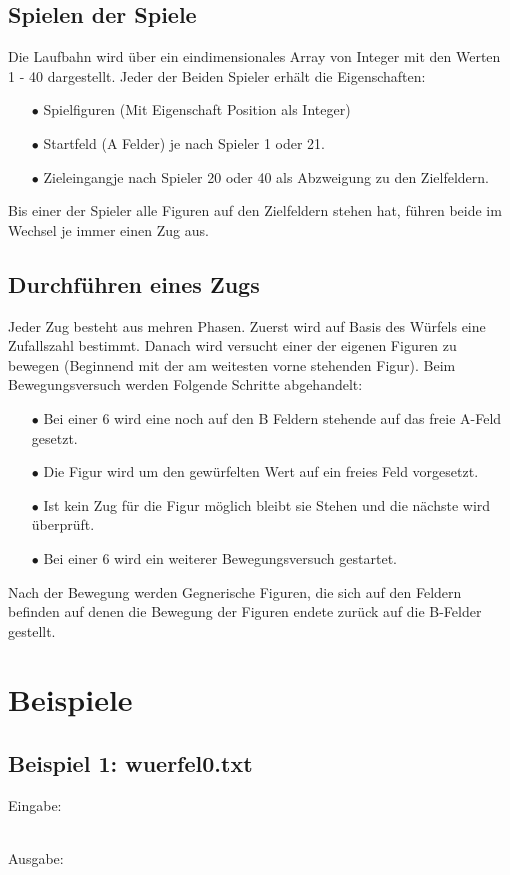 \documentclass[a4paper,11pt,ngerman]{scrartcl}
\begin{document}
\subsection{Spielen der \glqq Spiele\grqq}
Die Laufbahn wird über ein eindimensionales Array von Integer mit den Werten 1 - 40 dargestellt. Jeder der Beiden Spieler erhält die Eigenschaften:
\begin{enumerate}
	\item[$\bullet$] Spielfiguren (Mit Eigenschaft Position als Integer)
	\item[$\bullet$] Startfeld (\glqq A Felder\grqq) je nach Spieler 1 oder 21.
	\item[$\bullet$] \glqq Zieleingang\grqq \space je nach Spieler 20 oder 40 als Abzweigung zu den Zielfeldern.	
\end{enumerate} 
Bis einer der Spieler alle Figuren auf den Zielfeldern stehen hat, führen beide im Wechsel je immer einen Zug aus.
\subsection{Durchführen eines Zugs}
Jeder Zug besteht aus mehren Phasen. Zuerst wird auf Basis des Würfels eine Zufallszahl bestimmt. Danach wird versucht einer der eigenen Figuren zu bewegen (Beginnend mit der am weitesten vorne stehenden Figur). Beim Bewegungsversuch werden Folgende Schritte abgehandelt:
\begin{enumerate}
	\item[$\bullet$] Bei einer 6 wird eine noch auf den B Feldern stehende auf das freie A-Feld gesetzt.
	\item[$\bullet$] Die Figur wird um den gewürfelten Wert auf ein freies Feld vorgesetzt.
	\item[$\bullet$] Ist kein Zug für die Figur möglich bleibt sie Stehen und die nächste wird überprüft.
	\item[$\bullet$] Bei einer 6 wird ein weiterer Bewegungsversuch gestartet.	
\end{enumerate}
Nach der Bewegung werden Gegnerische Figuren, die sich auf den Feldern befinden auf denen die Bewegung der Figuren endete zurück auf die B-Felder gestellt.

 

\section{Beispiele}
\subsection{Beispiel 1: wuerfel0.txt}
Eingabe:
\begin{tcolorbox}[center,width=12cm,title=Textfiles/wuerfel0.txt]
	\centering
	
\end{tcolorbox}
\\ Ausgabe:
\centering
\begin{tcolorbox}[center,width=16cm,title=Textfiles/wuerfel0\_result.txt]
	
	
\end{tcolorbox}
\end{document}
